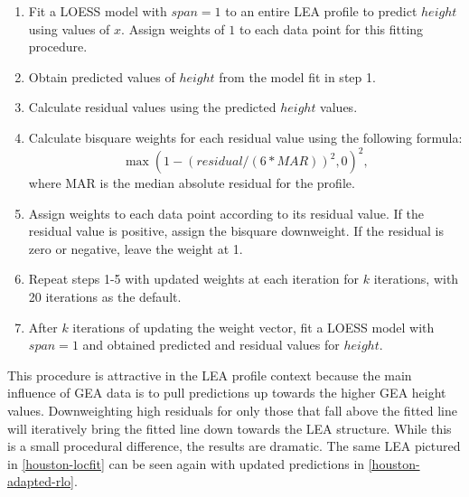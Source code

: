 \documentclass[12pt]{article}
\begin{document}
\begin{enumerate}

\item Fit a LOESS model with $span = 1$ to an entire LEA profile to predict $height$ using values of $x$. Assign weights of $1$ to each data point for this fitting procedure.  
\item Obtain predicted values of $height$ from the model fit in step 1.  
\item Calculate residual values using the predicted $height$ values.  
\item Calculate bisquare weights for each residual value using the following formula:  
$$\max(1 - (residual/(6*MAR))^2, 0)^2,$$   where MAR is the median absolute residual for the profile.  
\item Assign weights to each data point according to its residual value. If the residual value is positive, assign the bisquare downweight. If the residual is zero or negative, leave the weight at 1.  
\item Repeat steps 1-5 with updated weights at each iteration for $k$ iterations, with 20 iterations as the default.  
\item After $k$ iterations of updating the weight vector, fit a LOESS model with $span = 1$ and obtained predicted and residual values for $height$.  

\end{enumerate}

This procedure is attractive in the LEA profile context because the main
influence of GEA data is to pull predictions up towards the higher GEA
height values. Downweighting high residuals for only those that fall
above the fitted line will iteratively bring the fitted line down
towards the LEA structure. While this is a small procedural difference,
the results are dramatic. The same LEA pictured in
\autoref{houston-locfit} can be seen again with updated predictions in
\autoref{houston-adapted-rlo}.
\end{document}
